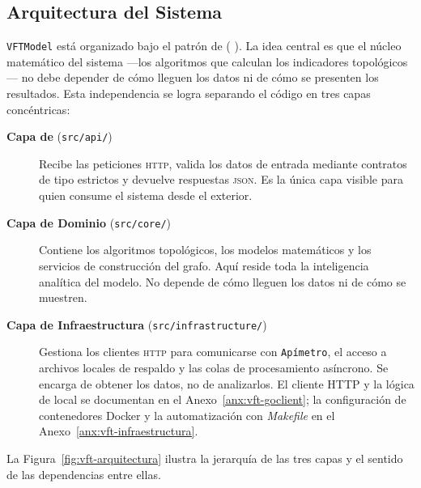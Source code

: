 
\subsection{Arquitectura del Sistema}
\label{sec:vft-arquitectura}

\label{subsec:vft-capas}


\texttt{VFTModel} está organizado bajo el patrón de  (
). La idea central es que el núcleo matemático del
sistema —los algoritmos que calculan los indicadores topológicos— no debe
depender de cómo lleguen los datos ni de cómo se presenten los resultados. Esta
independencia se logra separando el código en tres capas concéntricas:

\begin{description}
    \item[\textbf{Capa de \api{}} (\texttt{src/api/})]
    Recibe las peticiones \textsc{http}, valida los datos de entrada mediante
    contratos de tipo estrictos y devuelve respuestas \textsc{json}. Es la única
    capa visible para quien consume el sistema desde el exterior.

    \item[\textbf{Capa de Dominio} (\texttt{src/core/})]
    Contiene los algoritmos topológicos, los modelos matemáticos y los servicios
    de construcción del grafo. Aquí reside toda la inteligencia analítica del
    modelo. No depende de cómo lleguen los datos ni de cómo se muestren.

    \item[\textbf{Capa de Infraestructura} (\texttt{src/infrastructure/})]
    Gestiona los clientes \textsc{http} para comunicarse con \texttt{Apímetro}, el acceso
    a archivos \geojson{} locales de respaldo y las colas de procesamiento
    asíncrono. Se encarga de obtener los datos, no de analizarlos. El cliente
    HTTP y la lógica de  local se documentan en el
    Anexo~\ref{anx:vft-goclient}; la configuración de contenedores Docker y la
    automatización con \textit{Makefile} en el Anexo~\ref{anx:vft-infraestructura}.
\end{description}

La Figura~\ref{fig:vft-arquitectura} ilustra la jerarquía de las tres capas y el
sentido de las dependencias entre ellas.

